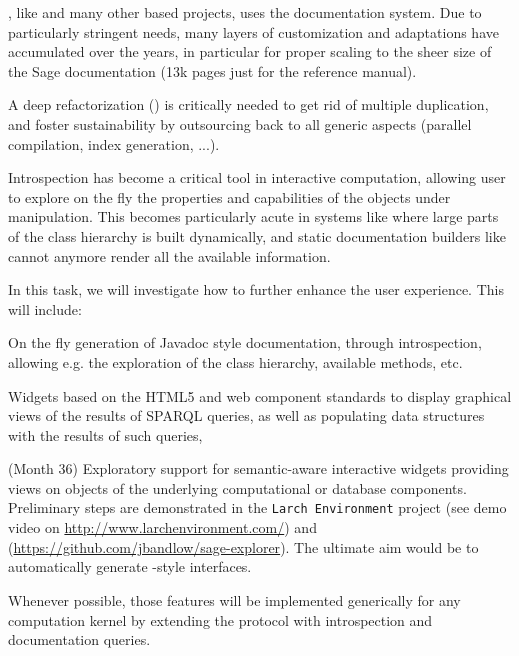 \begin{workpackage}
\begin{tasklist}
\begin{task}[id=sage-sphinx, title=Refactor \Sage's \Sphinx documentation system, PM=6]
  \Sage, like \Python and many other \Python based projects, uses the
  \Sphinx documentation system. Due to particularly stringent needs,
  many layers of customization and adaptations have accumulated over
  the years, in particular for proper scaling to the sheer size of the
  Sage documentation (13k pages just for the reference manual).

  A deep refactorization () is critically needed to get rid of multiple
  duplication, and foster sustainability by outsourcing back to \Sphinx
  all generic aspects (parallel compilation, index generation, ...).
\end{task}

\begin{task}[id=dynamic-inspect,title=Dynamic documentation and exploration system]
  Introspection has become a critical tool in interactive computation,
  allowing user to explore on the fly the properties and capabilities
  of the objects under manipulation. This becomes particularly acute
  in systems like \Sage where large parts of the class hierarchy is
  built dynamically, and static documentation builders like \Sphinx
  cannot anymore render all the available information.

  In this task, we will investigate how to further enhance the user
  experience. This will include:
  \begin{compactitem}
  \item On the fly generation of Javadoc style documentation, through
    introspection, allowing e.g. the exploration of the class
    hierarchy, available methods, etc.
  \item Widgets based on the HTML5 and web component standards to display
    graphical views of the results of SPARQL queries, as well as populating data
    structures with the results of such queries,
  \item {} (Month 36)
    Exploratory support for semantic-aware interactive widgets
    providing views on objects of the underlying computational or
    database components. Preliminary steps are demonstrated in the
    \texttt{Larch Environment} project (see demo video on
    \url{http://www.larchenvironment.com/}) and
    (\url{https://github.com/jbandlow/sage-explorer}). The ultimate
    aim would be to automatically generate \LMFDB-style interfaces.
  \end{compactitem}
  Whenever possible, those features will be implemented generically
  for any computation kernel by extending the \Jupyter protocol with
  introspection and documentation queries.
\end{task}


\end{tasklist}
\end{workpackage}
